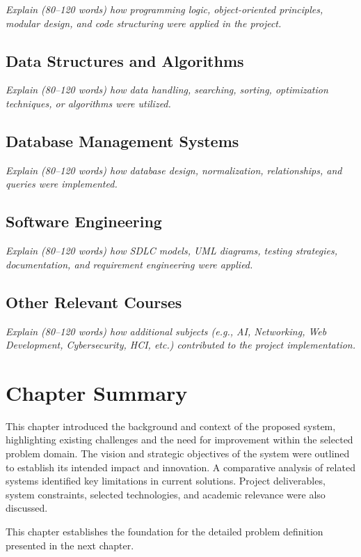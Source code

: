 \textit{Explain (80–120 words) how programming logic, object-oriented principles, modular design, and code structuring were applied in the project.}


\subsection{Data Structures and Algorithms}

\textit{Explain (80–120 words) how data handling, searching, sorting, optimization techniques, or algorithms were utilized.}


\subsection{Database Management Systems}

\textit{Explain (80–120 words) how database design, normalization, relationships, and queries were implemented.}


\subsection{Software Engineering}

\textit{Explain (80–120 words) how SDLC models, UML diagrams, testing strategies, documentation, and requirement engineering were applied.}


\subsection{Other Relevant Courses}

\textit{Explain (80–120 words) how additional subjects (e.g., AI, Networking, Web Development, Cybersecurity, HCI, etc.) contributed to the project implementation.}

\section{Chapter Summary}

This chapter introduced the background and context of the proposed system, 
highlighting existing challenges and the need for improvement within the 
selected problem domain. The vision and strategic objectives of the system 
were outlined to establish its intended impact and innovation. A comparative 
analysis of related systems identified key limitations in current solutions. 
Project deliverables, system constraints, selected technologies, and academic 
relevance were also discussed. 

This chapter establishes the foundation for the detailed problem definition 
presented in the next chapter.
